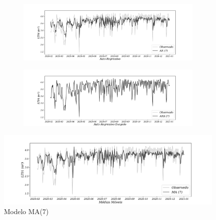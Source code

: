 \begin{figure}[H]
	\centering
	\caption{Comparação dos modelos AR e ARX \label{fig:1-ar} \label{fig:1-arx}}
	\begin{subfigure}{1\textwidth}
			\includegraphics[width=\linewidth]{Modelos/Figuras/AR}
			
				
		\end{subfigure}
	
	\begin{subfigure}{1\textwidth}
			\includegraphics[width=\linewidth]{Modelos/Figuras/ARX}
			
				
		\end{subfigure}
	
	
\end{figure}




\begin{figure}[H]
	\centering
	\caption{Modelo MA(7) }
	\label{fig:1-ma}
	\includegraphics[width=1\linewidth]{Modelos/Figuras/MA}
	
	
\end{figure}





